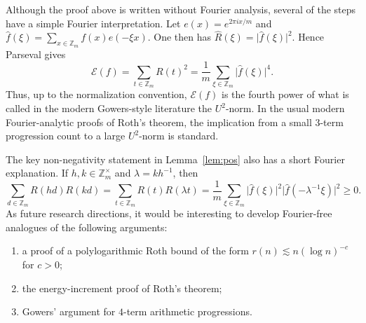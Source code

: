 \documentclass[11pt]{amsart}
\newcommand{\Z}{\mathbb{Z}}
\newcommand{\abs}[1]{\lvert#1\rvert}
\numberwithin{equation}{section}
\theoremstyle{plain}
\theoremstyle{remark}
\begin{document}
Although the proof above is written without Fourier analysis, several of the steps have a simple Fourier interpretation. Let $e(x)=e^{2\pi i x/m}$ and
$\widehat f(\xi)=\sum_{x\in\Z_m} f(x)e(-\xi x)$. One then has
$\widehat R(\xi)=\abs{\widehat f(\xi)}^2$. Hence Parseval gives
$$
\mathcal E(f)=\sum_{t\in\Z_m}R(t)^2=
\frac1m\sum_{\xi\in\Z_m}\abs{\widehat f(\xi)}^4.
$$
Thus, up to the normalization convention, $\mathcal E(f)$ is the fourth power
of what is called in the modern Gowers-style literature the $U^2$-norm. In the
usual modern Fourier-analytic proofs of Roth's theorem, the implication from a small
$3$-term progression count to a large $U^2$-norm is standard.

The key non-negativity statement in Lemma~\ref{lem:pos} also has a short Fourier
explanation. If $h,k\in\Z_m^\times$ and $\lambda=kh^{-1}$, then
\begin{equation}\label{eq:fourier-positivity}
\sum_{d\in\Z_m}R(hd)R(kd)
=\sum_{t\in\Z_m}R(t)R(\lambda t)
=\frac1m\sum_{\xi\in\Z_m}
\abs{\widehat f(\xi)}^2
\abs{\widehat f(-\lambda^{-1}\xi)}^2
\geq 0.
\end{equation}
As future research directions, it would be interesting to develop Fourier-free analogues of the following
arguments:
\begin{enumerate}
    \item a proof of a polylogarithmic Roth bound of the form $r(n)\lesssim n(\log n)^{-c}$ for $c>0$;
    \item the energy-increment proof of Roth's theorem;
    \item Gowers' argument \cite{Gowers98} for $4$-term arithmetic progressions.
\end{enumerate}
\end{document}
